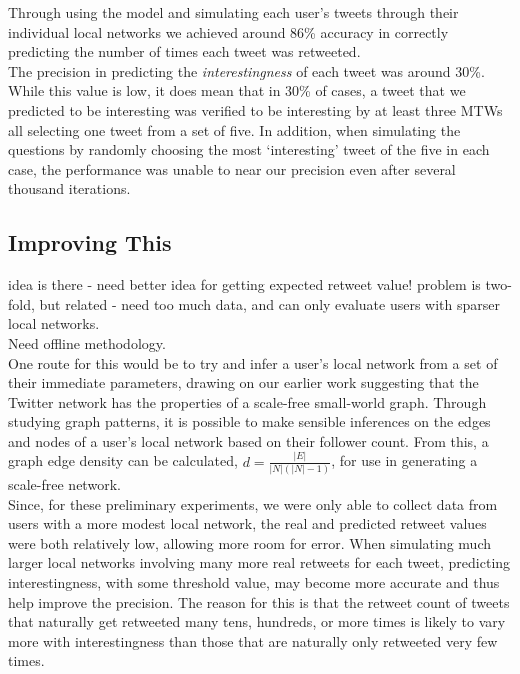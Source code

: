 Through using the model and simulating each user's tweets through their individual local networks we achieved around 86\% accuracy in correctly predicting the number of times each tweet was retweeted. 
\\
The precision in predicting the \textit{interestingness} of each tweet was around 30\%. While this value is low, it does mean that in 30\% of cases, a tweet that we predicted to be interesting was verified to be interesting by at least three MTWs all selecting one tweet from a set of five. In addition, when simulating the questions by randomly choosing the most `interesting' tweet of the five in each case, the performance was unable to near our precision even after several thousand iterations.

\subsection{Improving This}
idea is there - need better idea for getting expected retweet value! problem is two-fold, but related - need too much data, and can only evaluate users with sparser local networks.
\\
Need offline methodology.
\\
One route for this would be to try and infer a user's local network from a set of their immediate parameters, drawing on our earlier work suggesting that the Twitter network has the properties of a scale-free small-world graph. Through studying graph patterns, it is possible to make sensible inferences on the edges and nodes of a user's local network based on their follower count. From this, a graph edge density can be calculated, $ d = \frac{|E|}{|N|(|N|-1)} $, for use in generating a scale-free network.
\\
Since, for these preliminary experiments, we were only able to collect data from users with a more modest local network, the real and predicted retweet values were both relatively low, allowing more room for error. When simulating much larger local networks involving many more real retweets for each tweet, predicting interestingness, with some threshold value, may become more accurate and thus help improve the precision. The reason for this is that the retweet count of tweets that naturally get retweeted many tens, hundreds, or more times is likely to vary more with interestingness than those that are naturally only retweeted very few times.

